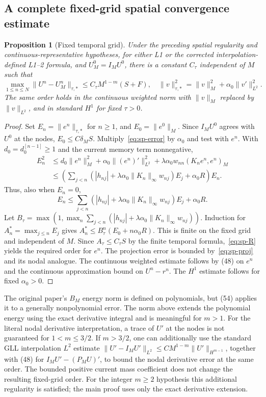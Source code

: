 \documentclass[11pt,a4paper]{amsart}
\theoremstyle{remark}
\theoremstyle{plain}
\newtheorem{proposition}{Proposition}[section]
\theoremstyle{remark}
\numberwithin{equation}{section}
\begin{document}
\subsection{A complete fixed-grid spatial convergence estimate}
\begin{proposition}[Fixed temporal grid]\label{prop:sp-fixed}
Under the preceding spatial regularity and continuous-representative hypotheses, for either L1 or the corrected interpolation-defined L1--2 formula, and $U_M^0=I_M U^0$, there is a constant $C_\tau$ independent of $M$ such that
\[
 \max_{1\le n\le N}\|U^n-U_M^n\|_{\tau,*}\le C_\tau M^{1-m}(S+F),
 \quad \|v\|_{\tau,*}^2=\|v\|_M^2+\alpha_0\|v'\|_{L^2}^2.
\]
The same order holds in the continuous weighted norm with $\|v\|_M$ replaced by $\|v\|_{L^2}$, and in standard $H^1$ for fixed $\tau>0$.
\end{proposition}
\begin{proof}
Set $E_n=\|e^n\|_{\tau,*}$ for $n\ge1$, and $E_0=\|e^0\|_M$. Since $I_M U^0$ agrees with $U^0$ at the nodes, $E_0\le C\delta_M S$. Multiply~\eqref{eq:sp-error} by $\alpha_0$ and test with $e^n$. With $d_0=d_0^{[n-1]}\ge1$ and the current memory term nonnegative,
\begin{align*}
 E_n^2&\le d_0\|e^n\|_M^2+\alpha_0\|(e^n)'\|_{L^2}^2
 +\lambda\alpha_0w_{nn}(K_ne^n,e^n)_M\\
 &\le \left(\sum_{j<n}(|h_{nj}|+\lambda\alpha_0\|K_n\|_\infty w_{nj})E_j+\alpha_0 R\right)E_n.
\end{align*}
Thus, also when $E_n=0$,
\begin{equation}\label{eq:sp-rec}
 E_n\le\sum_{j<n}(|h_{nj}|+\lambda\alpha_0\|K_n\|_\infty w_{nj})E_j+\alpha_0 R.
\end{equation}
Let $B_\tau=\max(1,\max_n\sum_{j<n}(|h_{nj}|+\lambda\alpha_0\|K_n\|_\infty w_{nj}))$. Induction for $A_n^*=\max_{j\le n} E_j$ gives $A_n^*\le B_\tau^n(E_0+n\alpha_0R)$. This is finite on the fixed grid and independent of $M$. Since $A_\tau\le C_\tau S$ by the finite temporal formula,~\eqref{eq:sp-R} yields the required order for $e^n$. The projection error is bounded by~\eqref{eq:sp-proj} and its nodal analogue. The continuous weighted estimate follows by (48) on $e^n$ and the continuous approximation bound on $U^n-r^n$. The $H^1$ estimate follows for fixed $\alpha_0>0$.
\end{proof}
The original paper's $B_M$ energy norm is defined on polynomials, but (54) applies it to a generally nonpolynomial error. The norm above extends the polynomial energy using the exact derivative integral and is meaningful for $m>1$. For the literal nodal derivative interpretation, a trace of $U'$ at the nodes is not guaranteed for $1<m\le3/2$. If $m>3/2$, one can additionally use the standard GLL interpolation $L^2$ estimate $\|U'-I_M U'\|_{L^2}\le CM^{1-m}\|U'\|_{H^{m-1}}$, together with (48) for $I_M U'-(P_MU)'$, to bound the nodal derivative error at the same order. The bounded positive current mass coefficient does not change the resulting fixed-grid order. For the integer $m\ge2$ hypothesis this additional regularity is satisfied; the main proof uses only the exact derivative extension.
\end{document}
